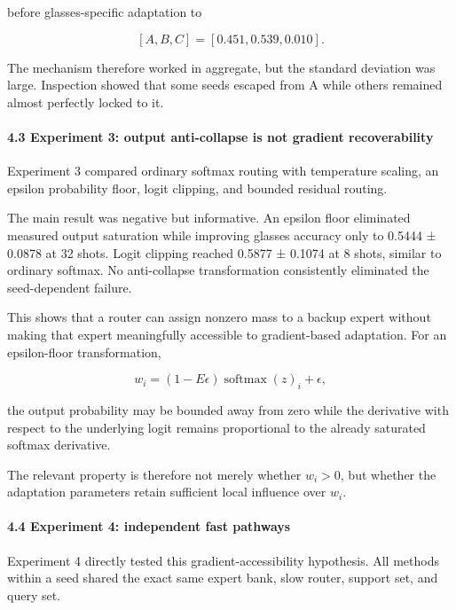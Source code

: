 \documentclass[
  10pt,
]{article}
\begin{document}
before glasses-specific adaptation to

\[
[A,B,C]=[0.451,0.539,0.010].
\]

The mechanism therefore worked in aggregate, but the standard deviation
was large. Inspection showed that some seeds escaped from A while others
remained almost perfectly locked to it.

\hypertarget{experiment-3-output-anti-collapse-is-not-gradient-recoverability}{%
\paragraph{4.3 Experiment 3: output anti-collapse is not gradient
recoverability}\label{experiment-3-output-anti-collapse-is-not-gradient-recoverability}}

Experiment 3 compared ordinary softmax routing with temperature scaling,
an epsilon probability floor, logit clipping, and bounded residual
routing.

The main result was negative but informative. An epsilon floor
eliminated measured output saturation while improving glasses accuracy
only to 0.5444 ± 0.0878 at 32 shots. Logit clipping reached 0.5877 ±
0.1074 at 8 shots, similar to ordinary softmax. No anti-collapse
transformation consistently eliminated the seed-dependent failure.

This shows that a router can assign nonzero mass to a backup expert
without making that expert meaningfully accessible to gradient-based
adaptation. For an epsilon-floor transformation,

\[
w_i=(1-E\epsilon)\operatorname{softmax}(z)_i+\epsilon,
\]

the output probability may be bounded away from zero while the
derivative with respect to the underlying logit remains proportional to
the already saturated softmax derivative.

The relevant property is therefore not merely whether \(w_i>0\), but
whether the adaptation parameters retain sufficient local influence over
\(w_i\).

\hypertarget{experiment-4-independent-fast-pathways}{%
\paragraph{4.4 Experiment 4: independent fast
pathways}\label{experiment-4-independent-fast-pathways}}

Experiment 4 directly tested this gradient-accessibility hypothesis. All
methods within a seed shared the exact same expert bank, slow router,
support set, and query set.
\end{document}
